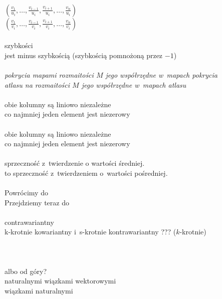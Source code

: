 \documentclass[a4paper,11pt]{article}
\begin{document}
\noindent
{} \\[0.3em]
\Jest
$( \frac{ v_{ 1 } }{ u_{ i } }, \ldots, \frac{ v_{ i - 1 } }{ u_{ i } },
\frac{ v_{ i + 1 } }{ u_{ i } }, \ldots, \frac{ v_{ n } }{ u_{ i } } )$ \\[0.5em]
\Powin
$\left( \frac{ v_{ 1 } }{ v_{ i } }, \ldots, \frac{ v_{ i - 1 } }{ v_{ i } },
  \frac{ v_{ i + 1 } }{ v_{ i } }, \ldots, \frac{ v_{ n } }{ v_{ i } } \right)$
\\[0.5em]
 \\
\Jest  szybkości \\
\Powin jest minus szybkością (szybkością pomnożoną przez $-1$) \\
 \\
\Jest  \textit{pokrycia mapami rozmaitości $M$ jego współrzędne
  w~mapach pokrycia} \\
\Powin \textit{atlasu na rozmaitości $M$ jego współrzędne
  w~mapach atlasu} \\
 \\
\Jest  obie kolumny są liniowo niezależne \\
\Powin co najmniej jeden element jest niezerowy \\
 \\
\Jest  obie kolumny są liniowo niezależne \\
\Powin co najmniej jeden element jest niezerowy \\
 \\
\Jest  sprzeczność z~twierdzenie o wartości średniej. \\
\Powin to sprzeczność z~twierdzeniem o~wartości pośredniej. \\
 \\
\Jest  Powrócimy do \\
\Powin Przejdziemy teraz do \\
 \\
\Jest  contrawariantny \\
\Powin k-krotnie kowariantny i~s-krotnie kontrawariantny ??? ($k$-krotnie) \\
 \\
\Jest  \\
\Powin \\
 albo od góry? \\
\Jest  naturalnymi wiązkami wektorowymi \\
\Powin wiązkami naturalnymi \\
 \\
\end{document}
